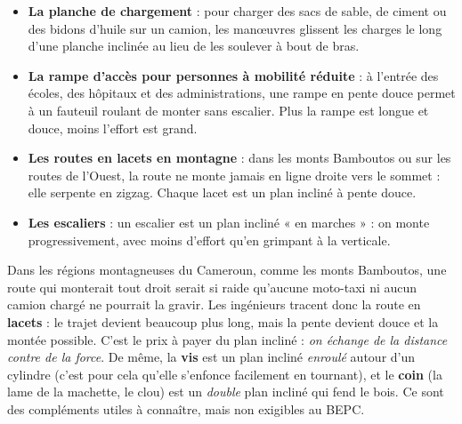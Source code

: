 \documentclass[11pt]{article}
\begin{document}
\begin{itemize}
  \item \textbf{La planche de chargement} : pour charger des sacs de sable, de ciment ou des bidons d'huile sur un camion, les manœuvres glissent les charges le long d'une planche inclinée au lieu de les soulever à bout de bras.
  \item \textbf{La rampe d'accès pour personnes à mobilité réduite} : à l'entrée des écoles, des hôpitaux et des administrations, une rampe en pente douce permet à un fauteuil roulant de monter sans escalier. Plus la rampe est longue et douce, moins l'effort est grand.
  \item \textbf{Les routes en lacets en montagne} : dans les monts Bamboutos ou sur les routes de l'Ouest, la route ne monte jamais en ligne droite vers le sommet : elle serpente en zigzag. Chaque lacet est un plan incliné à pente douce.
  \item \textbf{Les escaliers} : un escalier est un plan incliné « en marches » : on monte progressivement, avec moins d'effort qu'en grimpant à la verticale.
\end{itemize}

\begin{savaistu}
Dans les régions montagneuses du Cameroun, comme les monts Bamboutos, une route qui monterait tout droit serait si raide qu'aucune moto-taxi ni aucun camion chargé ne pourrait la gravir. Les ingénieurs tracent donc la route en \textbf{lacets} : le trajet devient beaucoup plus long, mais la pente devient douce et la montée possible. C'est le prix à payer du plan incliné : \emph{on échange de la distance contre de la force}. De même, la \textbf{vis} est un plan incliné \emph{enroulé} autour d'un cylindre (c'est pour cela qu'elle s'enfonce facilement en tournant), et le \textbf{coin} (la lame de la machette, le clou) est un \emph{double} plan incliné qui fend le bois. Ce sont des compléments utiles à connaître, mais non exigibles au BEPC.
\end{savaistu}
\end{document}
